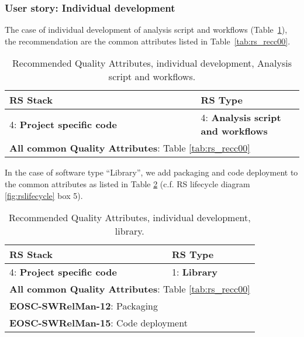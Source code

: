 \subsubsection{User story: Individual development}

The case of individual development of analysis script and workflows (Table~\ref{tab:rs_recc01}), the recommendation are the common attributes listed in Table~\ref{tab:rs_recc00}.

\begin{center}
\begin{table}[h]
  \small
  \begin{tabular}{|p{0.65\linewidth}|p{0.35\linewidth}|} \hline

    \textbf{RS Stack} & \textbf{RS Type} \\ \hline \hline
    4: \textbf{Project specific code} &
    4: \textbf{Analysis script and workflows} \\ \hline \hline
    \multicolumn{2}{|l|}{\textbf{All common Quality Attributes}: Table \ref{tab:rs_recc00}} \\ \hline

  \end{tabular}
  \caption{Recommended Quality Attributes, individual development, Analysis script and workflows.}
  \label{tab:rs_recc01}
\end{table}
\end{center}

In the case of software type ``Library'', we add packaging and code deployment to the common attributes as listed in Table \ref{tab:rs_recc02} (c.f. RS lifecycle diagram \ref{fig:rslifecycle} box 5).

\begin{center}
\begin{table}[h]
  \small
  \begin{tabular}{|p{0.65\linewidth}|p{0.35\linewidth}|} \hline

    \textbf{RS Stack} & \textbf{RS Type} \\ \hline \hline
    4: \textbf{Project specific code} &
    1: \textbf{Library} \\ \hline \hline
    \multicolumn{2}{|l|}{\textbf{All common Quality Attributes}: Table \ref{tab:rs_recc00}} \\ \hline
    \multicolumn{2}{|l|}{\textbf{EOSC-SWRelMan-12}: Packaging} \\ \hline
    \multicolumn{2}{|l|}{\textbf{EOSC-SWRelMan-15}: Code deployment} \\ \hline

  \end{tabular}
  \caption{Recommended Quality Attributes, individual development, library.}
  \label{tab:rs_recc02}
\end{table}
\end{center}

